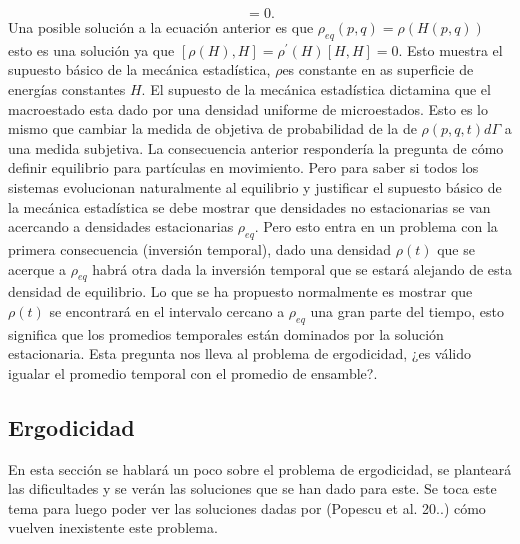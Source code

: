 \begin{equation}
[\rho_{eq}, H]=0.
\end{equation}
Una posible solución a la ecuación anterior es que $\rho_{eq}(p,q)=\rho(H(p,q))$ esto es una solución ya que $[\rho(H),H]=\rho^{'}(H)[H,H]=0$. Esto muestra el supuesto básico de la mecánica estadística, $\rho$es constante en as superficie de energías constantes $H$. El supuesto de la mecánica estadística dictamina que el macroestado esta dado por una densidad uniforme de microestados. Esto es lo mismo que cambiar la medida de objetiva de probabilidad de la de $\rho(p,q,t) d\Gamma$ a una medida subjetiva.
La consecuencia anterior respondería la pregunta de cómo definir equilibrio para partículas en movimiento. Pero para saber si todos los sistemas evolucionan naturalmente al equilibrio  y justificar el supuesto básico de la mecánica estadística se debe mostrar que densidades no estacionarias se van acercando a densidades estacionarias $\rho_{eq}$. Pero esto entra en un problema con la primera consecuencia (inversión temporal), dado una densidad $\rho(t)$ que se acerque a $\rho_{eq}$ habrá otra dada la inversión temporal que se estará alejando de esta densidad de equilibrio. Lo que se ha propuesto normalmente es mostrar que $\rho(t)$ se encontrará en el intervalo cercano a $\rho_{eq}$ una gran parte del tiempo, esto significa que los promedios temporales están dominados por la solución estacionaria. Esta pregunta nos lleva al problema de ergodicidad, ¿es válido igualar el promedio temporal con el promedio de ensamble?.

\subsection{Ergodicidad}
En esta sección se hablará un poco sobre el problema de ergodicidad, se planteará las dificultades y se verán las soluciones que se han dado para este. Se toca este tema para luego poder ver las soluciones dadas por (Popescu et al. 20..) cómo vuelven inexistente este problema.








